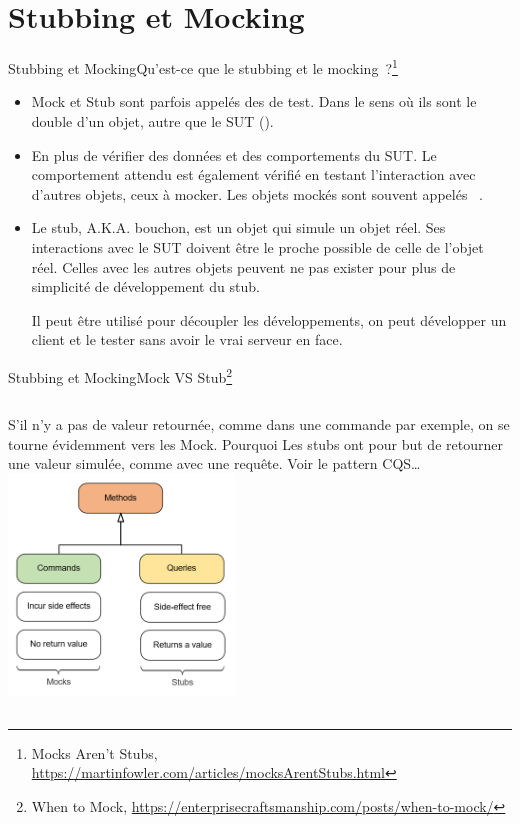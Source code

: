 \documentclass{beamer}
\begin{document}
    \section{Stubbing et Mocking}\label{sec:stub-mock}

    \begin{frame}{Stubbing et Mocking}{Qu'est-ce que le stubbing et le mocking~?\footnote{\label{fowler-stub-mock}Mocks Aren't Stubs, \url{https://martinfowler.com/articles/mocksArentStubs.html}}}
        \begin{itemize}
            \item Mock et Stub sont parfois appelés des  de test.
            Dans le sens où ils sont le double d'un objet, autre que le SUT ().
            \item En plus de vérifier des données et des comportements du SUT.
            Le comportement attendu est également vérifié en testant l'interaction avec d'autres objets, ceux à mocker.
            Les objets mockés sont souvent appelés ~.
            \item Le stub, A.K.A. bouchon, est un objet qui simule un objet réel.
            Ses interactions avec le SUT doivent être le proche possible de celle de l'objet réel.
            Celles avec les autres objets peuvent ne pas exister pour plus de simplicité de développement du stub.

            Il peut être utilisé pour découpler les développements, on peut développer un client et le tester sans avoir le vrai serveur en face.
        \end{itemize}
    \end{frame}

    \begin{frame}{Stubbing et Mocking}{Mock VS Stub\footnote{When to Mock, \url{https://enterprisecraftsmanship.com/posts/when-to-mock/}}}
        \begin{columns}
            S'il n'y a pas de valeur retournée, comme dans une commande par exemple, on se tourne évidemment vers les Mock. Pourquoi 
            \bigbreak
            Les stubs ont pour but de retourner une valeur simulée, comme avec une requête.
            \bigbreak
            Voir le pattern CQS\ldots
            \centering
            \includegraphics[width=6cm]{image/mock-vs-stub-1}
        \end{columns}
    \end{frame}
\end{document}
